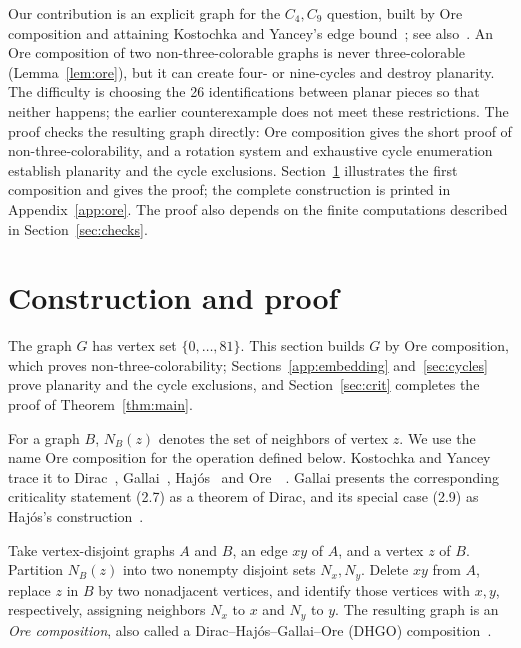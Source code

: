 \documentclass[11pt]{article}
\begin{document}
Our contribution is an explicit graph for the $C_4,C_9$ question, built
by Ore composition and attaining Kostochka and Yancey's edge
bound~\cite[Theorem 3]{kybound}; see also~\cite{kyfour}.
An Ore composition of two non-three-colorable graphs is never
three-colorable (Lemma~\ref{lem:ore}), but it can create four- or
nine-cycles and destroy planarity. The difficulty is choosing the 26
identifications between planar pieces so that neither happens; the
earlier counterexample does not meet these restrictions. The proof
checks the resulting graph directly: Ore composition gives the short
proof of non-three-colorability, and a rotation system and exhaustive
cycle enumeration establish planarity and the cycle exclusions.
Section~\ref{sec:ore} illustrates the first composition and gives the
proof; the complete construction is printed in Appendix~\ref{app:ore}.
The proof also depends on the finite computations described in
Section~\ref{sec:checks}.

\section{Construction and proof}\label{sec:ore}
The graph $G$ has vertex set $\{0,\ldots,81\}$. This section builds $G$
by Ore composition, which proves non-three-colorability;
Sections~\ref{app:embedding} and~\ref{sec:cycles} prove planarity and the
cycle exclusions, and Section~\ref{sec:crit} completes the proof of
Theorem~\ref{thm:main}.

For a graph $B$, $N_B(z)$ denotes the set of neighbors of vertex $z$.
We use the name Ore composition for the operation defined below.
Kostochka and Yancey trace it to Dirac~\cite{dirac}, Gallai~\cite{gallai},
Haj\'os~\cite{hajos} and Ore~\cite{ore}~\cite[Section~1]{ky}. Gallai
presents the corresponding criticality statement (2.7) as a theorem of
Dirac, and its special case (2.9) as Haj\'os's
construction~\cite[Section~2, (2.7)--(2.9)]{gallai}.

\begin{samepage}
Take vertex-disjoint graphs $A$ and $B$, an edge $xy$ of $A$, and a
vertex $z$ of $B$. Partition $N_B(z)$ into two nonempty disjoint sets
$N_x,N_y$. Delete $xy$ from $A$, replace $z$ in $B$ by two nonadjacent
vertices, and identify those vertices with $x,y$, respectively, assigning
neighbors $N_x$ to $x$ and $N_y$ to $y$. The resulting graph is an
\emph{Ore composition}, also called a Dirac--Haj\'os--Gallai--Ore (DHGO)
composition~\cite[Section 1]{ky}.
\end{samepage}
\end{document}
